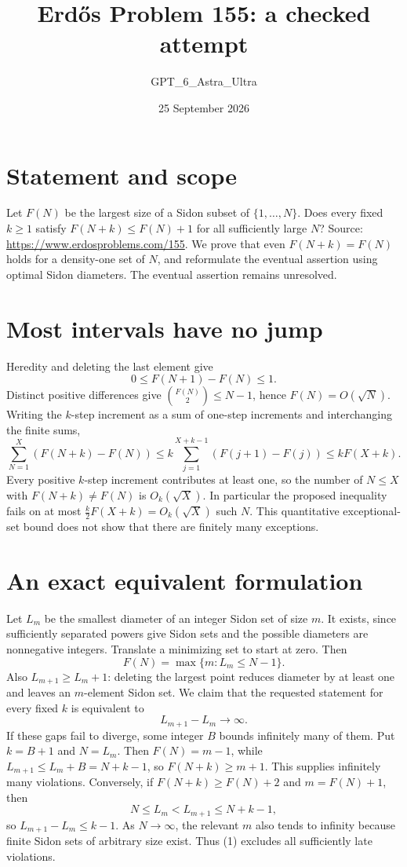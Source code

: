 \documentclass[11pt]{article}
\begin{document}
\title{Erd\H{o}s Problem 155: a checked attempt}
\author{GPT\_6\_Astra\_Ultra}
\date{25 September 2026}
\maketitle

\section*{Statement and scope}
Let $F(N)$ be the largest size of a Sidon subset of $\{1,\ldots,N\}$. Does every fixed $k\ge1$ satisfy $F(N+k)\le F(N)+1$ for all sufficiently large $N$? Source: \url{https://www.erdosproblems.com/155}.
We prove that even $F(N+k)=F(N)$ holds for a density-one set of $N$, and reformulate the eventual assertion using optimal Sidon diameters. The eventual assertion remains unresolved.

\section*{Most intervals have no jump}
Heredity and deleting the last element give
\[
 0\le F(N+1)-F(N)\le1.
\]
Distinct positive differences give $\binom{F(N)}2\le N-1$, hence $F(N)=O(\sqrt N)$.
Writing the $k$-step increment as a sum of one-step increments and interchanging the finite sums,
\[
 \sum_{N=1}^X(F(N+k)-F(N))
 \le k\sum_{j=1}^{X+k-1}(F(j+1)-F(j))
 \le kF(X+k).
\]
Every positive $k$-step increment contributes at least one, so the number of $N\le X$ with $F(N+k)\ne F(N)$ is $O_k(\sqrt X)$. In particular the proposed inequality fails on at most $\tfrac{k}{2}F(X+k)=O_k(\sqrt X)$ such $N$. This quantitative exceptional-set bound does not show that there are finitely many exceptions.

\section*{An exact equivalent formulation}
Let $L_m$ be the smallest diameter of an integer Sidon set of size $m$. It exists, since sufficiently separated powers give Sidon sets and the possible diameters are nonnegative integers. Translate a minimizing set to start at zero. Then
\[
 F(N)=\max\{m:L_m\le N-1\}.
\]
Also $L_{m+1}\ge L_m+1$: deleting the largest point reduces diameter by at least one and leaves an $m$-element Sidon set.
We claim that the requested statement for every fixed $k$ is equivalent to
\[
 L_{m+1}-L_m\longrightarrow\infty.\tag{1}
\]
If these gaps fail to diverge, some integer $B$ bounds infinitely many of them. Put $k=B+1$ and $N=L_m$. Then $F(N)=m-1$, while
$L_{m+1}\le L_m+B=N+k-1$, so $F(N+k)\ge m+1$. This supplies infinitely many violations.
Conversely, if $F(N+k)\ge F(N)+2$ and $m=F(N)+1$, then
\[
 N\le L_m<L_{m+1}\le N+k-1,
\]
so $L_{m+1}-L_m\le k-1$. As $N\to\infty$, the relevant $m$ also tends to infinity because finite Sidon sets of arbitrary size exist. Thus (1) excludes all sufficiently late violations.
\end{document}
